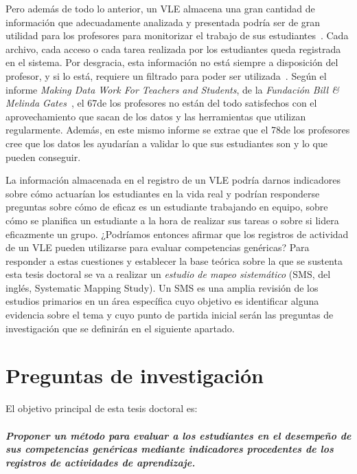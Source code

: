 Pero además de todo lo anterior, un VLE almacena una gran cantidad de información que adecuadamente analizada y presentada podría ser de gran utilidad para los profesores para monitorizar el trabajo de sus estudiantes~\cite{podgorelec:2011}. Cada archivo, cada acceso o cada tarea realizada por los estudiantes queda registrada en el sistema. Por desgracia, esta información no está siempre a disposición del profesor, y si lo está, requiere un filtrado para poder ser utilizada~\cite{Chebil:2012}. Según el informe \emph{Making Data Work For Teachers and Students}, de la \emph{Fundación Bill \& Melinda Gates}~\cite{gates2015making}, el 67\percentage de los profesores no están del todo satisfechos con el aprovechamiento que sacan de los datos y las herramientas que utilizan regularmente. Además, en este mismo informe se extrae que el 78\percentage de los profesores cree que los datos les ayudarían a validar lo que sus estudiantes son y lo que pueden conseguir.   

La información almacenada en el registro de un VLE podría darnos indicadores sobre cómo actuarían los estudiantes en la vida real y podrían responderse preguntas sobre cómo de eficaz es un estudiante trabajando en equipo, sobre cómo se planifica un estudiante a la hora de realizar sus tareas o sobre si lidera eficazmente un grupo. ¿Podríamos entonces afirmar que los registros de actividad de un VLE pueden utilizarse para evaluar competencias genéricas? Para responder a estas cuestiones y establecer la base teórica sobre la que se sustenta esta tesis doctoral se va a realizar un \emph{estudio de mapeo sistemático} (SMS, del inglés, Systematic Mapping Study). Un SMS es una amplia revisión de los estudios primarios en un área específica cuyo objetivo es identificar alguna evidencia sobre el tema y cuyo punto de partida inicial serán las preguntas de investigación que se definirán en el siguiente apartado.

\section{Preguntas de investigación}

El objetivo principal de esta tesis doctoral es:

\paragraph*{\emph{Proponer un método para evaluar a los estudiantes en el desempeño de sus competencias genéricas mediante indicadores procedentes de los registros de actividades de aprendizaje.}}

